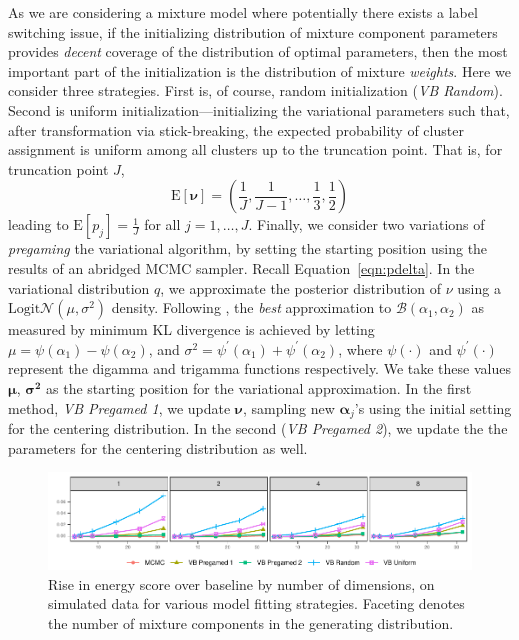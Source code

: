 As we are considering a mixture model where potentially there exists a label switching
    issue, if the initializing distribution of mixture component parameters provides
    \emph{decent} coverage of the distribution of optimal parameters, then the most 
    important part of the initialization is the distribution of mixture \emph{weights}.  
    Here we consider three strategies.  First is, of course, random initialization 
    (\emph{VB Random}).  Second is uniform initialization---initializing the variational 
    parameters such that, after transformation via stick-breaking, the expected probability 
    of cluster assignment is uniform among all clusters up to the truncation point. That 
    is, for truncation point $J$,
    \[
    \text{E}[\bm{\nu}] = \left(\frac{1}{J},\frac{1}{J-1},\ldots,\frac{1}{3},\frac{1}{2}\right)
    \]
    leading to $\text{E}[p_j] = \frac{1}{J}$ for all $j = 1,\ldots,J$.
    Finally, we consider two variations of \emph{pregaming} 
    the variational algorithm, by
    setting the starting position using the results of an abridged MCMC sampler.  
    Recall Equation~\eqref{eqn:pdelta}. In the variational distribution $q$, we approximate the 
    posterior distribution of $\nu$ using a $\text{Logit}\mathcal{N}(\mu,\sigma^2)$ density.  
    Following \cite{aitchison1980}, the \emph{best} approximation to 
    $\mathcal{B}(\alpha_1,\alpha_2)$ as measured by minimum KL divergence is achieved by 
    letting $\mu = \psi(\alpha_1) - \psi(\alpha_2)$, and 
    $\sigma^2 = \psi^{\prime}(\alpha_1) + \psi^{\prime}(\alpha_2)$, where 
    $\psi(\cdot)$ and $\psi^{\prime}(\cdot)$ represent the digamma and trigamma functions 
    respectively.  We take these values $\bm{\mu}$, $\bm{\sigma^2}$ as the starting position for
    the variational approximation. In the first method, \emph{VB Pregamed 1}, 
    we update $\bm{\nu}$, sampling new $\bm{\alpha}_j$'s using the initial setting
    for the centering distribution.  In the second (\emph{VB Pregamed 2}), we update the
    the parameters for the centering distribution as well.      

\begin{figure}[htb]
    \caption{Rise in energy score over baseline by number of dimensions, on simulated data 
    for various model fitting strategies. Faceting denotes the number of mixture components 
    in the generating distribution. \label{fig:energyscore}}
    \includegraphics[width=\linewidth]{plots/energy_score}
\end{figure}

